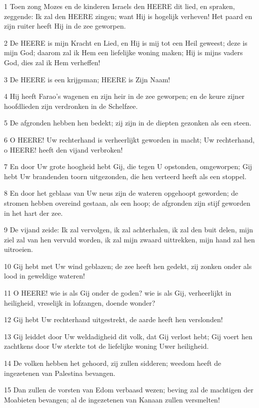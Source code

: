 \par 1 Toen zong Mozes en de kinderen Israels den HEERE dit lied, en spraken, zeggende: Ik zal den HEERE zingen; want Hij is hogelijk verheven! Het paard en zijn ruiter heeft Hij in de zee geworpen.
\par 2 De HEERE is mijn Kracht en Lied, en Hij is mij tot een Heil geweest; deze is mijn God; daarom zal ik Hem een liefelijke woning maken; Hij is mijns vaders God, dies zal ik Hem verheffen!
\par 3 De HEERE is een krijgsman; HEERE is Zijn Naam!
\par 4 Hij heeft Farao's wagenen en zijn heir in de zee geworpen; en de keure zijner hoofdlieden zijn verdronken in de Schelfzee.
\par 5 De afgronden hebben hen bedekt; zij zijn in de diepten gezonken als een steen.
\par 6 O HEERE! Uw rechterhand is verheerlijkt geworden in macht; Uw rechterhand, o HEERE! heeft den vijand verbroken!
\par 7 En door Uw grote hoogheid hebt Gij, die tegen U opstonden, omgeworpen; Gij hebt Uw brandenden toorn uitgezonden, die hen verteerd heeft als een stoppel.
\par 8 En door het geblaas van Uw neus zijn de wateren opgehoopt geworden; de stromen hebben overeind gestaan, als een hoop; de afgronden zijn stijf geworden in het hart der zee.
\par 9 De vijand zeide: Ik zal vervolgen, ik zal achterhalen, ik zal den buit delen, mijn ziel zal van hen vervuld worden, ik zal mijn zwaard uittrekken, mijn hand zal hen uitroeien.
\par 10 Gij hebt met Uw wind geblazen; de zee heeft hen gedekt, zij zonken onder als lood in geweldige wateren!
\par 11 O HEERE! wie is als Gij onder de goden? wie is als Gij, verheerlijkt in heiligheid, vreselijk in lofzangen, doende wonder?
\par 12 Gij hebt Uw rechterhand uitgestrekt, de aarde heeft hen verslonden!
\par 13 Gij leiddet door Uw weldadigheid dit volk, dat Gij verlost hebt; Gij voert hen zachtkens door Uw sterkte tot de liefelijke woning Uwer heiligheid.
\par 14 De volken hebben het gehoord, zij zullen sidderen; weedom heeft de ingezetenen van Palestina bevangen.
\par 15 Dan zullen de vorsten van Edom verbaasd wezen; beving zal de machtigen der Moabieten bevangen; al de ingezetenen van Kanaan zullen versmelten!
